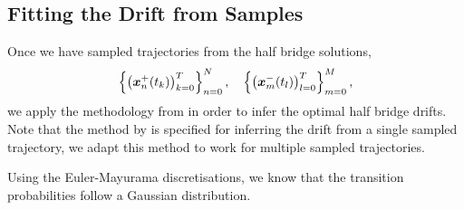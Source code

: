 \documentclass[a4paper,12pt,twoside,openright]{report}
\theoremstyle{definition}
\begin{document}
\subsection{Fitting the Drift from Samples}

Once we have sampled trajectories from the half bridge solutions,
\begin{align}
    \left\{ \big({\bm{x}}^{+}_n(t_k) \big)_{k=0}^T \right\}_{n=0}^{N}, \quad \left\{\big({\bm{x}}^{-}_m(t_l)\big)_{l=0}^T\right\}_{m=0}^{M},
\end{align} %
we  apply the methodology from \citep{ruttor2013approximate, batz2018approximate} in order to infer the optimal half bridge drifts. Note that the method by \cite{ruttor2013approximate} is specified for inferring the drift from a single sampled trajectory, we adapt this method to work for multiple sampled trajectories.

Using the Euler-Mayurama discretisations, we know that the transition probabilities follow a Gaussian distribution.
\end{document}
